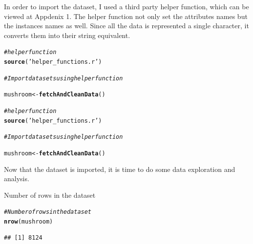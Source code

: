 \documentclass[10pt  ,usenames, dvipsnames]{article}\usepackage[]{graphicx}\usepackage[]{color}
\makeatletter
\newcommand{\hlstr}[1]{\textcolor[rgb]{0.192,0.494,0.8}{#1}}%
\newcommand{\hlcom}[1]{\textcolor[rgb]{0.678,0.584,0.686}{\textit{#1}}}%
\newcommand{\hlstd}[1]{\textcolor[rgb]{0.345,0.345,0.345}{#1}}%
\newcommand{\hlkwb}[1]{\textcolor[rgb]{0.69,0.353,0.396}{#1}}%
\newcommand{\hlkwd}[1]{\textcolor[rgb]{0.737,0.353,0.396}{\textbf{#1}}}%
\newenvironment{kframe}{%
 \def\at@end@of@kframe{}%
 \ifinner\ifhmode%
  \def\at@end@of@kframe{\end{minipage}}%
  \begin{minipage}{\columnwidth}%
 \fi\fi%
 \def\FrameCommand##1{\hskip\@totalleftmargin \hskip-\fboxsep
 \colorbox{shadecolor}{##1}\hskip-\fboxsep
     \hskip-\linewidth \hskip-\@totalleftmargin \hskip\columnwidth}%
 \MakeFramed {\advance\hsize-\width
   \@totalleftmargin\z@ \linewidth\hsize
   \@setminipage}}%
 {\par\unskip\endMakeFramed%
 \at@end@of@kframe}
\newenvironment{knitrout}{}{} %
\makeatother
\begin{document}
In order to import the dataset, I used a third party helper function, which can be viewed at Appdenix 1.
The helper function not only set the attributes names but the instances names as well. Since all the data is represented a single character, it converts them into their string equivalent.


\begin{knitrout}
\color{fgcolor}\begin{kframe}
\begin{alltt}
\hlcom{#helper function}
\hlkwd{source}\hlstd{(}\hlstr{'helper_functions.r'}\hlstd{)}

\hlcom{#Import datasets using helper function}

\hlstd{mushroom} \hlkwb{<-} \hlkwd{fetchAndCleanData}\hlstd{()}
\end{alltt}
\end{kframe}
\end{knitrout}


\begin{knitrout}
\color{fgcolor}\begin{kframe}
\begin{alltt}
\hlcom{#helper function}
\hlkwd{source}\hlstd{(}\hlstr{'helper_functions.r'}\hlstd{)}

\hlcom{#Import datasets using helper function}

\hlstd{mushroom} \hlkwb{<-} \hlkwd{fetchAndCleanData}\hlstd{()}
\end{alltt}
\end{kframe}
\end{knitrout}


Now that the dataset is imported, it is time to do some data exploration and analysis.

Number of rows in the dataset

\begin{knitrout}
\color{fgcolor}\begin{kframe}
\begin{alltt}
\hlcom{#Number of rows in the dataset}
\hlkwd{nrow}\hlstd{(mushroom)}
\end{alltt}
\end{kframe}
\end{knitrout}


\begin{knitrout}
\color{fgcolor}\begin{kframe}
\begin{verbatim}
## [1] 8124
\end{verbatim}
\end{kframe}
\end{knitrout}
\end{document}
